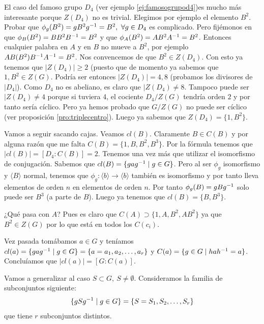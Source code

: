\begin{ej}
	\label{ej:clasesd4}
	El caso del famoso grupo $D_4$ (ver ejemplo \ref{ej:famosogrupod4})es mucho más interesante porque $Z(D_4)$ no es trivial. Elegimos por ejemplo el elemento $B^2$. Probar que $\phi_g(B^2) = gB^2\inv{g} = B^2,\ \forall g \in D_4$ es complicado. Pero fijémonos en que $\phi_B(B^2) = BB^2B^{-1} = B^2$ y que $\phi_A(B^2) = AB^2A^{-1} = B^2$. Entonces cualquier palabra en $A$ y en $B$ no mueve a $B^2$, por ejemplo $AB(B^2)B^{-1}A^{-1} = B^2$. Nos convencemos de que $B^2 \in Z(D_4)$. Con esto ya tenemos que $|Z(D_4)| \geq 2$ (puesto que de momento ya sabemos que $1, B^2 \in Z(G)$. Podría ser entonces $|Z(D_4)| = 4, 8$ (probamos los divisores de $|D_4|$). Como $D_4$ no es abeliano, es claro que $|Z(D_4) \neq 8$. Tampoco puede ser $|Z(D_4) \neq 4$ porque si tuviera 4, el cociente $D_4/Z(G)$ tendría orden $2$ y por tanto sería cíclico. Pero ya hemos probado que $G/Z(G)$ no puede ser cíclico (ver proposición \ref{pro:triplecentro}). Luego ya sabemos que $Z(D_4) = \{1, B^2\}$.
	
	Vamos a seguir sacando cajas. Veamos $cl(B)$. Claramente $B \in C(B)$ y por alguna razón que me falta $C(B) = \{1, B, B^2, B^3\}$. Por la fórmula tenemos que $|cl(B)| = [D_4:C(B)] = 2$. Tenemos una vez más que utilizar el isomorfismo de conjugación. Sabemos que $cl(B) = \{gag^{-1} \mid g \in G\}$. Pero al ser $\phi_g$ isomorfismo y $\langle B \rangle$ normal, tenemos que $\phi_g : \langle b \rangle \to \langle b \rangle$ también es isomorfismo y por tanto lleva elementos de orden $n$ en elementos de orden $n$. Por tanto $\phi_g(B) = gBg^{-1}$ solo puede ser $B^3$ (a parte de $B$). Luego ya tenemos que $cl(B) = \{B, B^3\}$.
	
	¿Qué pasa con $A$? Pues es claro que $C(A) \supset \{1, A, B^2, AB^2\}$ ya que $B^2 \in Z(G)$ por lo que está en todos los $C(c_i)$.
\end{ej}


\hr


Vez pasada tomábamos $a \in G$ y teníamos $cl(a) = \{g a g^{-1} \mid g \in G\} = \{a=a_1, a_2, \dots, a_r\}$ y $C(a) = \{g \in G \mid hah^{-1} = a \}$. Concluíamos que $|cl(a)| = [G:C(a)]$.

Vamos a generalizar al caso $S \subset G,\ S \neq \emptyset$. Consideramos la familia de subconjuntos siguiente:
\begin{align*}
\{gSg^{-1} \mid g \in G\} = \{S = S_1, S_2, \dots, S_r\}
\end{align*}
que tiene $r$ subconjuntos distintos.

